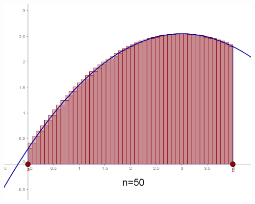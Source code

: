 \documentclass[nooutcomes,handout]{ximera}
\begin{document}
\begin{problem}
\begin{enumerate}
\begin{freeResponse}
\begin{image}
            \includegraphics[scale=.4]{figure3.png}
      \end{image}
      
      
    \end{freeResponse}
  \end{enumerate}
\end{problem}
\end{document}
